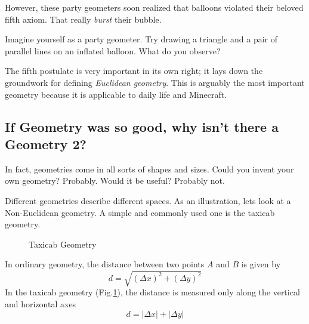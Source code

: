 \documentclass{article}
\begin{document}
However, these party geometers soon realized that balloons violated their beloved fifth axiom. That really \textit{burst} their bubble.

\begin{Exercise}
Imagine yourself as a party geometer. Try drawing a triangle and a pair of parallel lines on an inflated balloon. What do you observe?
\end{Exercise}
\medskip

The fifth postulate is very important in its own right; it lays down the groundwork for defining \textit{Euclidean geometry}. This is arguably the most important geometry because it is applicable to daily life and Minecraft.

\subsection{If Geometry was so good, why isn't there a Geometry 2?}
In fact, geometries come in all sorts of shapes and sizes. Could you invent your own geometry? Probably. Would it be useful? Probably not.

Different geometries describe different spaces. As an illustration, lets look at a Non-Euclidean geometry. A simple and commonly used one is the taxicab geometry.
\medskip

\begin{figure}[h]
    \centering
    \caption{Taxicab Geometry}
    \label{fig:taxicab}
\end{figure}

In ordinary  geometry, the distance between two points $A$ and $B$ is given by
\begin{equation*}
    d = \sqrt{(\Delta x)^2 + (\Delta y)^2}
\end{equation*}
\medskip
In the taxicab geometry (Fig.\;\ref{fig:taxicab}), the distance is measured only along the vertical and horizontal axes
\begin{equation*}
    d = |\Delta x| + |\Delta y|
\end{equation*}
\end{document}

